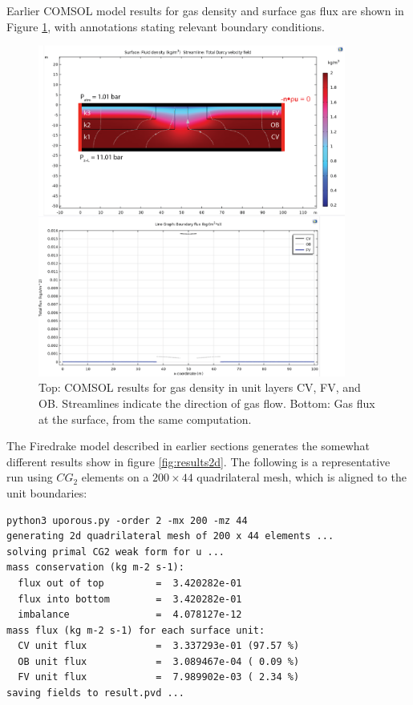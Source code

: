 \documentclass[11pt]{amsart}
\begin{document}
Earlier COMSOL model results for gas density and surface gas flux are shown in Figure \ref{fig:COMSOLresults}, with annotations stating relevant boundary conditions.  

\begin{figure}
   \centering
\includegraphics[width=0.9\textwidth]{figs/comsolDarcyLaw_units.png}
\caption{Top: COMSOL results for gas density in unit layers CV, FV, and OB.  Streamlines indicate the direction of gas flow.  Bottom: Gas flux at the surface, from the same computation.}
\label{fig:COMSOLresults}
\end{figure}

The Firedrake model described in earlier sections generates the somewhat different results show in figure \ref{fig:results2d}.  The following is a representative run using $CG_2$ elements on a $200\times 44$ quadrilateral mesh, which is aligned to the unit boundaries:
\begin{Verbatim}[fontsize=\small,frame=lines]
python3 uporous.py -order 2 -mx 200 -mz 44
generating 2d quadrilateral mesh of 200 x 44 elements ...
solving primal CG2 weak form for u ...
mass conservation (kg m-2 s-1):
  flux out of top         =  3.420282e-01
  flux into bottom        =  3.420282e-01
  imbalance               =  4.078127e-12
mass flux (kg m-2 s-1) for each surface unit:
  CV unit flux            =  3.337293e-01 (97.57 %)
  OB unit flux            =  3.089467e-04 ( 0.09 %)
  FV unit flux            =  7.989902e-03 ( 2.34 %)
saving fields to result.pvd ...
\end{Verbatim}
\end{document}
